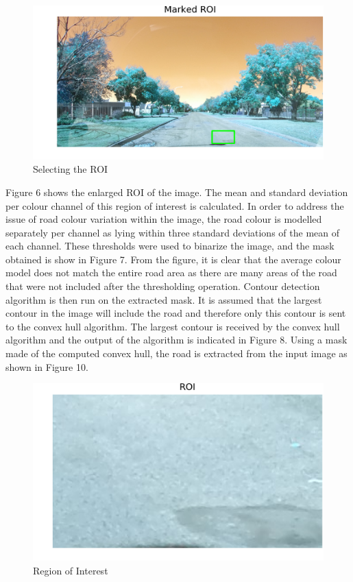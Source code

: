 \documentclass[journal]{IEEEtran}
\begin{document}
\begin{figure}[!htb]
\begin{center}
\includegraphics[scale=1]{Images/2_Marked_ROI.png}
\end{center}
\caption{Selecting the ROI}
\end{figure}

\vspace{0.5cm}

\noindent Figure 6 shows the enlarged ROI of the image. The mean and standard deviation per colour channel of this region of interest is calculated. In order to address the issue of road colour variation within the image, the road colour is modelled separately per channel as lying within three standard deviations of the mean of each channel. These thresholds were used to binarize the image, and the mask obtained is show in Figure 7. From the figure, it is clear that the average colour model does not match the entire road area as there are many areas of the road that were not included after the thresholding operation.
Contour detection algorithm is then run on the extracted mask. It is assumed that the largest contour in the image will include the road and therefore only this contour is sent to the convex hull algorithm.
The largest contour is received by the convex hull algorithm and the output of the algorithm is indicated in Figure 8.  Using a mask made of the computed convex hull, the road is extracted from the input image as shown in Figure 10.

\begin{figure}[!htb]
\begin{center}
\includegraphics[scale=0.65]{Images/3_ROI.png}
\end{center}
\caption{Region of Interest}
\end{figure}
\end{document}
